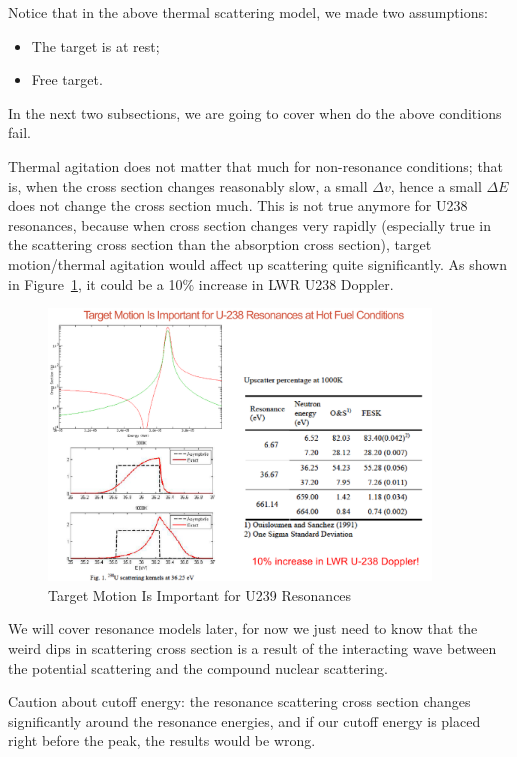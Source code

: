 \documentclass{school-22.211-notes}
\begin{document}
Notice that in the above thermal scattering model, we made two assumptions:
\begin{itemize}
\item The target is at rest;
\item Free target. 
\end{itemize}
In the next two subsections, we are going to cover when do the above conditions fail. 

Thermal agitation does not matter that much for non-resonance conditions; that is, when the cross section changes reasonably slow, a small $\Delta v$, hence a small $\Delta E$ does not change the cross section much. This is not true anymore for U238 resonances, because when cross section changes very rapidly (especially true in the scattering cross section than the absorption cross section), target motion/thermal agitation would affect up scattering quite significantly. As shown in Figure~\ref{timr}, it could be a 10\% increase in LWR U238 Doppler.  
\begin{figure}
  \centering
  \includegraphics[width=4in]{images/sl-d/target-in-motion-resonance.png}
  \caption{Target Motion Is Important for U239 Resonances} \label{timr}
\end{figure}
We will cover resonance models later, for now we just need to know that the weird dips in scattering cross section is a result of the interacting wave between the potential scattering and the compound nuclear scattering. 

Caution about cutoff energy: the resonance scattering cross section changes significantly around the resonance energies, and if our cutoff energy is placed right before the peak, the results would be wrong. 
\end{document}
